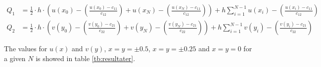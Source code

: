 \begin{equation}
\begin{align*}
{ Q }_{ 1 }&=\frac { 1 }{ 2 } \cdot h\cdot \left( u\left( { x }_{ 0 } \right) -\left( \frac { u\left( { x }_{ 0 } \right) -{ c }_{ 11 } }{ { c }_{ 12 } }  \right) +u\left( { x }_{ N } \right) -\left( \frac { u\left( { x }_{ N } \right) -{ c }_{ 11 } }{ { c }_{ 12 } }  \right)  \right) +h\sum _{ i=1 }^{ N-1 }{ u\left( { x }_{ i } \right) - } \left( \frac { u\left( { x }_{ i } \right) -{ c }_{ 11 } }{ { c }_{ 12 } }  \right) \\
{ Q }_{ 2 }&=\frac { 1 }{ 2 } \cdot h\cdot \left( v\left( { y }_{ 0 } \right) -\left( \frac { v\left( { y }_{ 0 } \right) -{ c }_{ 21 } }{ { c }_{ 22 } }  \right) +v\left( { y }_{ N } \right) -\left( \frac { v\left( { y }_{ N } \right) -{ c }_{ 21 } }{ { c }_{ 22 } }  \right)  \right) +h\sum _{ i=1 }^{ N-1 }{ v\left( { y }_{ i } \right) - } \left( \frac { v\left( { y }_{ i } \right) -{ c }_{ 21 } }{ { c }_{ 22 } }  \right)  
\end{align*}
\label{eq:Q12}
\end{equation}

The values for \( u\left( x \right)  \) and  \( v\left( y \right)  \), \( x=y= \pm0.5  \), \( x=y= \pm0.25  \) and \( x=y= 0  \)  for a given \( N \) is showed in table \ref{tb:resultater}.

